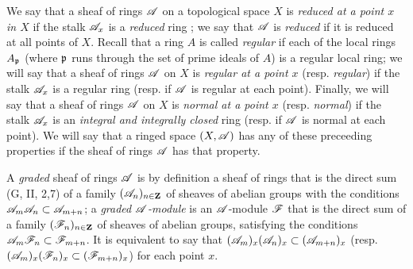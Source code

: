 \begin{env}[4.1.4]
\label{0.4.1.4}
We say that a sheaf of rings $\mathscr{A}$ on a topological space $X$ is
\emph{reduced at a point $x$ in $X$} if the stalk $\mathscr{A}_x$ is a \emph{reduced}
ring ; we say that $\mathscr{A}$ is \emph{reduced} if it is reduced
at all points of $X$. Recall that a ring $A$ is called \emph{regular} if each of
the local rings $A_\mathfrak{p}$ (where $\mathfrak{p}$ runs through the set of
prime ideals of $A$) is a regular local ring; we will say that a sheaf of rings
$\mathscr{A}$ on $X$ is \emph{regular at a point $x$} (resp. \emph{regular}) if the
stalk $\mathscr{A}_x$ is a regular ring (resp. if $\mathscr{A}$ is regular at each point).
Finally, we will say that a sheaf of rings $\mathscr{A}$ on $X$ is \emph{normal at a
point $x$} (resp. \emph{normal}) if the stalk $\mathscr{A}_x$ is an \emph{integral
and integrally closed} ring (resp. if $\mathscr{A}$ is normal at each point). We will
say that a ringed space $(X,\mathscr{A})$ has any of these preceeding properties if
the sheaf of rings $\mathscr{A}$ has that property.

A \emph{graded} sheaf of rings $\mathscr{A}$ is by definition a sheaf of rings that
is the direct sum (G, II, 2,7) of a family $(\mathscr{A}_n)_{n\in\mathbf{Z}}$ of sheaves
of abelian groups with the conditions $\mathscr{A}_m\mathscr{A}_n\subset\mathscr{A}_{m+n}$; a
\emph{graded $\mathscr{A}$-module} is an $\mathscr{A}$-module $\mathscr{F}$ that is the direct
sum of a family $(\mathscr{F}_n)_{n\in\mathbf{Z}}$ of sheaves of abelian groups,
satisfying the conditions $\mathscr{A}_m\mathscr{F}_n\subset\mathscr{F}_{m+n}$. It is
equivalent to say that $(\mathscr{A}_m)_x(\mathscr{A}_n)_x\subset(\mathscr{A}_{m+n})_x$
(resp. $(\mathscr{A}_m)_x(\mathscr{F}_n)_x\subset(\mathscr{F}_{m+n})_x$) for each point $x$.
\end{env}

